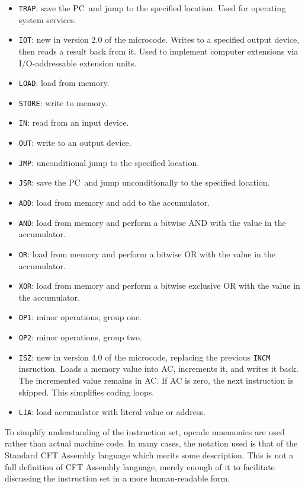 \documentclass[11pt,a4paper,twocolumns]{article}
\newcommand\op[1]{\texttt{#1}}
\newcommand\register[1]{\textsf{#1}}
\newcommand\A{\register{AC}}
\newcommand\PC{\register{PC}}
\begin{document}
\begin{itemize}
\item {\tt TRAP}: save the \PC\ and jump to the specified location. Used for operating system services.
\item {\tt IOT}: new in version 2.0 of the microcode. Writes to a specified output device, then reads a result back from it. Used to implement computer extensions via I/O-addressable extension units.
\item {\tt LOAD}: load from memory.
\item {\tt STORE}: write to memory.
\item {\tt IN}: read from an input device.
\item {\tt OUT}: write to an output device.
\item {\tt JMP}: unconditional jump to the specified location.
\item {\tt JSR}: save the \PC\ and jump unconditionally to the specified location.
\item {\tt ADD}: load from memory and add to the accumulator.
\item {\tt AND}: load from memory and perform a bitwise AND with the value in the accumulator.
\item {\tt OR}: load from memory and perform a bitwise OR with the value in the accumulator.
\item {\tt XOR}: load from memory and perform a bitwise exclusive OR with the value in the accumulator.
\item {\tt OP1}: minor operations, group one.
\item {\tt OP2}: minor operations, group two.
\item {\tt ISZ}: new in version 4.0 of the microcode, replacing the
  previous \op{INCM} insruction. Loads a memory value into \A,
  increments it, and writes it back. The incremented value remains in
  \A{}. If \A{} is zero, the next instruction is skipped. This
  simplifies coding loops.
\item {\tt LIA}: load accumulator with literal value or address.
\end{itemize}

To simplify understanding of the instruction set, opcode mnemonics are
used rather than actual machine code. In many cases, the notation used
is that of the Standard CFT Assembly language which merits some
description. This is not a full definition of CFT Assembly language,
merely enough of it to facilitate discussing the instruction set in
a more human-readable form.
\end{document}

